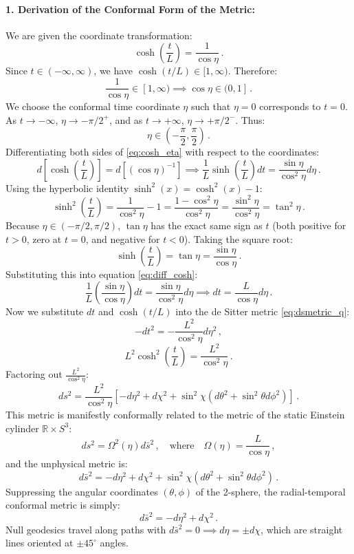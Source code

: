 \documentclass[12pt]{article}
\newcommand{\be}{\begin{equation}}
\newcommand{\ee}{\end{equation}}
\begin{document}
\paragraph{1. Derivation of the Conformal Form of the Metric:}
We are given the coordinate transformation:
\be
\cosh\left(\frac{t}{L}\right) = \frac{1}{\cos\eta} \,.
\label{eq:cosh_eta}
\ee
Since $t \in (-\infty, \infty)$, we have $\cosh(t/L) \in [1, \infty)$. Therefore:
\be
\frac{1}{\cos\eta} \in [1, \infty) \implies \cos\eta \in (0, 1] \,.
\ee
We choose the conformal time coordinate $\eta$ such that $\eta = 0$ corresponds to $t = 0$. As $t \to -\infty$, $\eta \to -\pi/2^+$, and as $t \to +\infty$, $\eta \to +\pi/2^-$. Thus:
\be
\eta \in \left( -\frac{\pi}{2}, \frac{\pi}{2} \right) \,.
\ee
Differentiating both sides of \eqref{eq:cosh_eta} with respect to the coordinates:
\be
d\left[ \cosh\left(\frac{t}{L}\right) \right] = d\left[ (\cos\eta)^{-1} \right] \implies \frac{1}{L} \sinh\left(\frac{t}{L}\right) dt = \frac{\sin\eta}{\cos^2\eta} d\eta \,.
\label{eq:diff_cosh}
\ee
Using the hyperbolic identity $\sinh^2(x) = \cosh^2(x) - 1$:
\be
\sinh^2\left(\frac{t}{L}\right) = \frac{1}{\cos^2\eta} - 1 = \frac{1 - \cos^2\eta}{\cos^2\eta} = \frac{\sin^2\eta}{\cos^2\eta} = \tan^2\eta \,.
\ee
Because $\eta \in (-\pi/2, \pi/2)$, $\tan\eta$ has the exact same sign as $t$ (both positive for $t > 0$, zero at $t = 0$, and negative for $t < 0$). Taking the square root:
\be
\sinh\left(\frac{t}{L}\right) = \tan\eta = \frac{\sin\eta}{\cos\eta} \,.
\ee
Substituting this into equation \eqref{eq:diff_cosh}:
\be
\frac{1}{L} \left( \frac{\sin\eta}{\cos\eta} \right) dt = \frac{\sin\eta}{\cos^2\eta} d\eta \implies dt = \frac{L}{\cos\eta} d\eta \,.
\label{eq:dt_eta}
\ee
Now we substitute $dt$ and $\cosh(t/L)$ into the de Sitter metric \eqref{eq:dsmetric_q}:
\be
- dt^2 = - \frac{L^2}{\cos^2\eta} d\eta^2 \,,
\ee
\be
L^2 \cosh^2\left(\frac{t}{L}\right) = \frac{L^2}{\cos^2\eta} \,.
\ee
Factoring out $\frac{L^2}{\cos^2\eta}$:
\be
ds^2 = \frac{L^2}{\cos^2\eta} \left[ - d\eta^2 + d\chi^2 + \sin^2\chi \left( d\theta^2 + \sin^2\theta d\phi^2 \right) \right] \,.
\label{eq:ds_conformal}
\ee
This metric is manifestly conformally related to the metric of the static Einstein cylinder $\mathbb{R} \times S^3$:
\be
ds^2 = \Omega^2(\eta) d\bar s^2 \,, \quad \text{where} \quad \Omega(\eta) = \frac{L}{\cos\eta} \,,
\ee
and the unphysical metric is:
\be
d\bar s^2 = - d\eta^2 + d\chi^2 + \sin^2\chi \left( d\theta^2 + \sin^2\theta d\phi^2 \right) \,.
\ee
Suppressing the angular coordinates $(\theta, \phi)$ of the 2-sphere, the radial-temporal conformal metric is simply:
\be
d\bar s^2 = - d\eta^2 + d\chi^2 \,.
\ee
Null geodesics travel along paths with $d\bar s^2 = 0 \implies d\eta = \pm d\chi$, which are straight lines oriented at $\pm 45^\circ$ angles.
\end{document}
